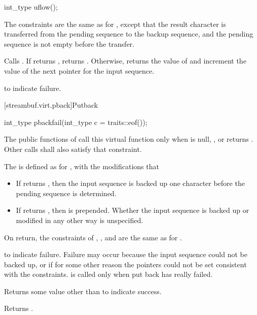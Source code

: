 %
\begin{itemdecl}
int_type uflow();
\end{itemdecl}

\begin{itemdescr}
\pnum
\expects
The constraints are the same as for
,
except that the result character is transferred from the pending
sequence to the backup sequence, and the pending sequence is not empty before the transfer.

\pnum
{}
Calls
.
If
returns
,
returns
.
Otherwise, returns the value of
and increment the value of the next pointer for the input sequence.

\pnum
\returns
{}
to indicate failure.
\end{itemdescr}

[streambuf.virt.pback]{Putback}

%
\begin{itemdecl}
int_type pbackfail(int_type c = traits::eof());
\end{itemdecl}

\begin{itemdescr}
\pnum
\remarks
The public functions of
call this virtual function only when
is null,
,
or
returns
.
Other calls shall also satisfy that constraint.

The
is defined as for
,
with the modifications that
\begin{itemize}
\item
If
returns
,
then the input sequence is backed up one character before the pending sequence is determined.
\item
If
returns , then  is prepended.
Whether the input sequence is backed up or modified in any other way is unspecified.
\end{itemize}

\pnum
\ensures
On return, the constraints of
,
,
and
are the same as for
.

\pnum
\returns
{}
to indicate failure.
Failure may occur because the input sequence could not be backed up, or if for some
other reason the pointers could not be set consistent with the constraints.
is called only when put back has really failed.

\pnum
Returns some value other than
to indicate success.

\pnum
{}
Returns
.
\end{itemdescr}

